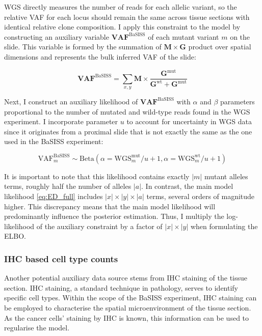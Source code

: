 \ac{WGS} directly measures the number of reads for each allelic variant, so the relative \acf{VAF} for each locus should remain the same across tissue sections with identical relative clone composition. I apply this constraint to the model by constructing an auxiliary variable $\mathbf{VAF}^{\text{BaSISS}}$ of each mutant variant $m$ on the slide. This variable is formed by the summation of $\mathbf{M} \times \mathbf{G}$ product over spatial dimensions and represents the bulk inferred \ac{VAF} of the slide:

\begin{equation} 
\mathbf{VAF}^{\text{BaSISS}} = \sum_{x,y} \mathbf{M} \times \dfrac{\mathbf{G}^{\text{mut}}}{\mathbf{G}^{\text{wt}} + \mathbf{G}^{\text{mut}}}
\end{equation}

Next, I construct an auxiliary likelihood of $\mathbf{VAF}^{\text{BaSISS}}$ with $\alpha$ and $\beta$ parameters proportional to the number of mutated and wild-type reads found in the \ac{WGS} experiment. I incorporate parameter $u$ to account for uncertainty in \ac{WGS} data since it originates from a proximal slide that is not exactly the same as the one used in the \ac{BaSISS} experiment:

\begin{equation} 
    \text{VAF}^{\text{BaSISS}}_m \sim \mathrm{Beta}(\alpha=\text{WGS}^\text{mut}_m / u + 1, \alpha=\text{WGS}^\text{wt}_m / u + 1)
\end{equation}

It is important to note that this likelihood contains exactly $|m|$ mutant alleles terms, roughly half the number of alleles $|a|$. In contrast, the main model likelihood \cref{eq:ED_full} includes $|x| \times |y| \times |a|$ terms, several orders of magnitude higher. This discrepancy means that the main model likelihood will predominantly influence the posterior estimation. Thus, I multiply the log-likelihood of the auxiliary constraint by a factor of $|x| \times |y|$ when formulating the \ac{ELBO}.

\subsubsection*{\Acl{IHC} based cell type counts}

Another potential auxiliary data source stems from \ac{IHC} staining of the tissue section. \ac{IHC} staining, a standard technique in pathology, serves to identify specific cell types. Within the scope of the \ac{BaSISS} experiment, \ac{IHC} staining can be employed to characterise the spatial microenvironment of the tissue section. As the cancer cells' staining by \ac{IHC} is known, this information can be used to regularise the model.

